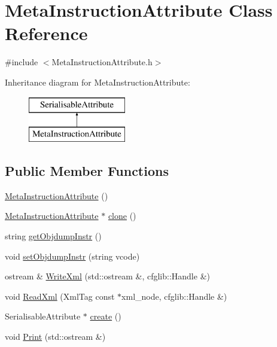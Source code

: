\hypertarget{classMetaInstructionAttribute}{}\section{Meta\+Instruction\+Attribute Class Reference}
\label{classMetaInstructionAttribute}


{\ttfamily \#include $<$Meta\+Instruction\+Attribute.\+h$>$}

Inheritance diagram for Meta\+Instruction\+Attribute\+:\begin{figure}[H]
\begin{center}
\leavevmode
\includegraphics[height=2.000000cm]{classMetaInstructionAttribute}
\end{center}
\end{figure}
\subsection*{Public Member Functions}
\begin{DoxyCompactItemize}
\item 
\hyperlink{classMetaInstructionAttribute_a191d7f515a704ce03dd08bd70a99f505}{Meta\+Instruction\+Attribute} ()
\item 
\hyperlink{classMetaInstructionAttribute}{Meta\+Instruction\+Attribute} $\ast$ \hyperlink{classMetaInstructionAttribute_ae2650f9203c48687539dd550574937ba}{clone} ()
\item 
string \hyperlink{classMetaInstructionAttribute_a6f48798affab7135022b0a7d53c24430}{get\+Objdump\+Instr} ()
\item 
void \hyperlink{classMetaInstructionAttribute_a9fc979d829aaf9598c58a22f482ce134}{set\+Objdump\+Instr} (string vcode)
\item 
ostream \& \hyperlink{classMetaInstructionAttribute_a6b4f27589f0fc145ed4c23c5763f5930}{Write\+Xml} (std\+::ostream \&, cfglib\+::\+Handle \&)
\item 
void \hyperlink{classMetaInstructionAttribute_a5c2c96126868d18fac5828ce29285046}{Read\+Xml} (Xml\+Tag const $\ast$xml\+\_\+node, cfglib\+::\+Handle \&)
\item 
Serialisable\+Attribute $\ast$ \hyperlink{classMetaInstructionAttribute_a23e508c5ca9c295a510a69c9c5e942ba}{create} ()
\item 
void \hyperlink{classMetaInstructionAttribute_aadfd48ff5e2587e7535954acb6439a17}{Print} (std\+::ostream \&)
\end{DoxyCompactItemize}


